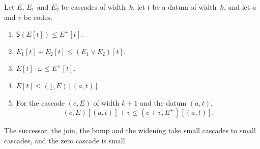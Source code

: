 \documentclass[11pt]{amsart}
\makeatletter
\newcommand{\bS}{\mathsf{S}}
\newcommand{\bplus}{\mathbin{+}}
\newcommand{\btimes}{\mathbin{\cdot}}
\newcommand{\num}[1]{\underline{#1}}          %
\newcommand{\act}[2]{#1[#2]}                  %
\newif\ifagdarefs
\newcommand{\AgdaRefs}[1]{\ifagdarefs{\footnotesize\color{agdablue}(#1)}\else\unskip\fi}
\newcommand{\Agda}[2]{{\footnotesize\color{agdablue}\textsf{#1}%
  \ifblank{#2}{}{\texttt{.}\allowbreak\texttt{#2}}}}
\let\ttt@plain\texttt
\renewcommand{\texttt}[1]{{\footnotesize\color{agdablue}\ttt@plain{#1}}}
\theoremstyle{plain}
\theoremstyle{definition}
\makeatother
\begin{document}
\begin{lemma}
\label{lem:cascade-ops}
Let $E$, $E_1$ and $E_2$ be cascades of width~$k$, let $t$ be a datum
of width~$k$, and let $a$ and $v$ be codes.
\begin{enumerate}
\item\label{item:suc}
  $\bS(\act E t) \le \act{E^{+}}{t}$.
\item\label{item:join}
  $\act{E_1}{t} \bplus \act{E_2}{t} \le \act{(E_1 \vee E_2)}{t}$.
\item\label{item:bump}
  $\act E t \btimes \omega \le \act{E^{\times}}{t}$.
\item\label{item:up}
  $\act E t \le \act{(\num 1, E)}{(a,t)}$.
\item\label{item:fold}
  For the cascade $(c, E)$ of width $k+1$ and the datum $(a,t)$,
  \[
    \act{(c,E)}{(a,t)} \bplus v \le \act{(c \bplus v, E^{+})}{(a,t)} .
  \]
\end{enumerate}
The successor, the join, the bump and the widening take small cascades
to small cascades, and the zero cascade is small.
\AgdaRefs{\Agda{BrouwerOrdinals.Cascade}{valSc-suc}; \texttt{valSc-join},
\texttt{valSc-bump}, \texttt{valSc-up}, \texttt{sucSc-All<},
\texttt{joinSc-All<}, \texttt{bumpSc-All<}, \texttt{upSc-All<},
\texttt{zeroSc-All<}; \Agda{BrouwerOrdinals.RectAdd}{valSc-fold}.}
\end{lemma}
\end{document}
